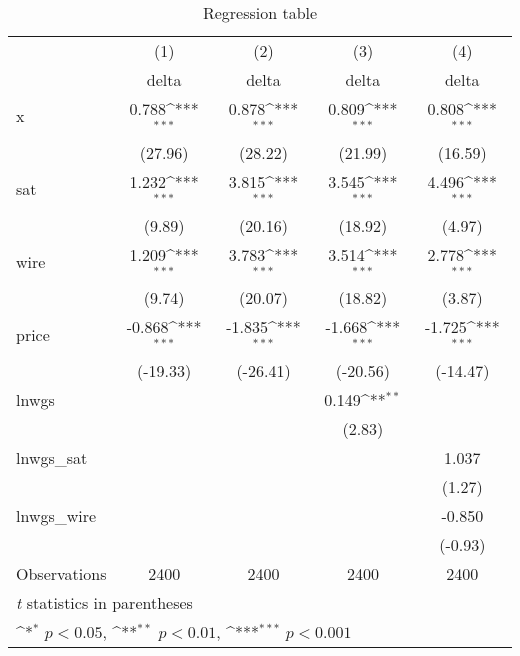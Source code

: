\begin{table}[htbp]\centering
\def\sym#1{\ifmmode^{#1}\else\(^{#1}\)\fi}
\caption{Regression table\label{tab1}}
\begin{tabular}{l*{4}{c}}
\hline\hline
                    &\multicolumn{1}{c}{(1)}&\multicolumn{1}{c}{(2)}&\multicolumn{1}{c}{(3)}&\multicolumn{1}{c}{(4)}\\
                    &\multicolumn{1}{c}{delta}&\multicolumn{1}{c}{delta}&\multicolumn{1}{c}{delta}&\multicolumn{1}{c}{delta}\\
\hline
x                   &       0.788\sym{***}&       0.878\sym{***}&       0.809\sym{***}&       0.808\sym{***}\\
                    &     (27.96)         &     (28.22)         &     (21.99)         &     (16.59)         \\
[1em]
sat                 &       1.232\sym{***}&       3.815\sym{***}&       3.545\sym{***}&       4.496\sym{***}\\
                    &      (9.89)         &     (20.16)         &     (18.92)         &      (4.97)         \\
[1em]
wire                &       1.209\sym{***}&       3.783\sym{***}&       3.514\sym{***}&       2.778\sym{***}\\
                    &      (9.74)         &     (20.07)         &     (18.82)         &      (3.87)         \\
[1em]
price               &      -0.868\sym{***}&      -1.835\sym{***}&      -1.668\sym{***}&      -1.725\sym{***}\\
                    &    (-19.33)         &    (-26.41)         &    (-20.56)         &    (-14.47)         \\
[1em]
lnwgs               &                     &                     &       0.149\sym{**} &                     \\
                    &                     &                     &      (2.83)         &                     \\
[1em]
lnwgs\_sat           &                     &                     &                     &       1.037         \\
                    &                     &                     &                     &      (1.27)         \\
[1em]
lnwgs\_wire          &                     &                     &                     &      -0.850         \\
                    &                     &                     &                     &     (-0.93)         \\
\hline
Observations        &        2400         &        2400         &        2400         &        2400         \\
\hline\hline
\multicolumn{5}{l}{\footnotesize \textit{t} statistics in parentheses}\\
\multicolumn{5}{l}{\footnotesize \sym{*} \(p<0.05\), \sym{**} \(p<0.01\), \sym{***} \(p<0.001\)}\\
\end{tabular}
\end{table}
